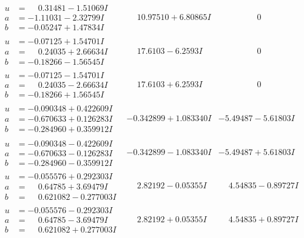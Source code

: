 \documentclass[1p]{elsarticle_modified}
\theoremstyle{definition}
\begin{document}
$$\begin{array}{c|c|c}
\begin{aligned}
u &= \phantom{-}0.31481 - 1.51069 I \\
a &= -1.11031 - 2.32799 I \\
b &= -0.05247 + 1.47834 I\end{aligned}
 & \phantom{-}10.97510 + 6.80865 I & \phantom{-0.000000 } 0 \\ \hline\begin{aligned}
u &= -0.07125 + 1.54701 I \\
a &= \phantom{-}0.24035 + 2.66634 I \\
b &= -0.18266 - 1.56545 I\end{aligned}
 & \phantom{-}17.6103 - 6.2593 I & \phantom{-0.000000 } 0 \\ \hline\begin{aligned}
u &= -0.07125 - 1.54701 I \\
a &= \phantom{-}0.24035 - 2.66634 I \\
b &= -0.18266 + 1.56545 I\end{aligned}
 & \phantom{-}17.6103 + 6.2593 I & \phantom{-0.000000 } 0 \\ \hline\begin{aligned}
u &= -0.090348 + 0.422609 I \\
a &= -0.670633 + 0.126283 I \\
b &= -0.284960 + 0.359912 I\end{aligned}
 & -0.342899 + 1.083340 I & -5.49487 - 5.61803 I \\ \hline\begin{aligned}
u &= -0.090348 - 0.422609 I \\
a &= -0.670633 - 0.126283 I \\
b &= -0.284960 - 0.359912 I\end{aligned}
 & -0.342899 - 1.083340 I & -5.49487 + 5.61803 I \\ \hline\begin{aligned}
u &= -0.055576 + 0.292303 I \\
a &= \phantom{-}0.64785 + 3.69479 I \\
b &= \phantom{-}0.621082 - 0.277003 I\end{aligned}
 & \phantom{-}2.82192 - 0.05355 I & \phantom{-}4.54835 - 0.89727 I \\ \hline\begin{aligned}
u &= -0.055576 - 0.292303 I \\
a &= \phantom{-}0.64785 - 3.69479 I \\
b &= \phantom{-}0.621082 + 0.277003 I\end{aligned}
 & \phantom{-}2.82192 + 0.05355 I & \phantom{-}4.54835 + 0.89727 I\\

\end{array}$$
\end{document}
